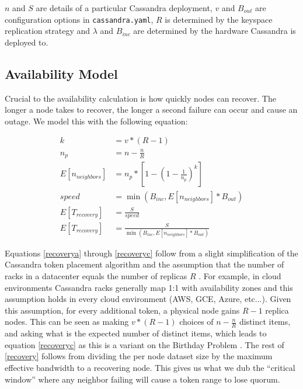 \documentclass{article}
\begin{document}
$n$ and $S$ are details of a particular Cassandra deployment, $v$ and $B_{out}$ are configuration options in \texttt{cassandra.yaml}, $R$ is determined by the keyspace replication strategy and $\lambda$ and $B_{inc}$ are determined by the hardware Cassandra is deployed to.

\subsection{Availability Model}
Crucial to the availability calculation is how quickly nodes can recover. The longer a node takes to recover, the longer a second failure can occur and cause an outage. We model this with the following equation:

\begin{subequations} \label{recovery}
    \begin{align}
        k & = v * (R - 1) \\ \label{recoverya}
        n_{p} & = n - \frac{n}{R} \\
        E[n_{neighbors}] & = n_{p} * [1 - (1-\frac{1}{n_{p}})^k] \label{recoveryc} \\
        speed & = \min(B_{inc}, E[n_{neighbors}] * B_{out}) \\
        E[T_{recovery}] & = \frac{S}{speed} \\
        E[T_{recovery}] & = \frac{S}{\min(B_{inc}, E[n_{neighbors}] * B_{out})}
    \end{align}
\end{subequations}

Equations \ref{recoverya} through \ref{recoveryc} follow from a slight simplification of the Cassandra token placement algorithm and the assumption that the number of racks in a datacenter equals the number of replicas $R$ \cite{replication}. For example, in cloud environments Cassandra racks generally map 1:1 with availability zones and this assumption holds in every cloud environment (AWS, GCE, Azure, etc...). Given this assumption, for every additional token, a physical node gains $R - 1$ replica nodes. This can be seen as making $v * (R - 1)$ choices of $n - \frac{n}{R}$ distinct items, and asking what is the expected number of distinct items, which leads to equation \ref{recoveryc} as this is a variant on the Birthday Problem \cite{neighbors}. The rest of \ref{recovery} follows from dividing the per node dataset size by the maximum effective bandwidth to a recovering node. This gives us what we dub the ``critical window'' where any neighbor failing will cause a token range to lose quorum.
\end{document}
